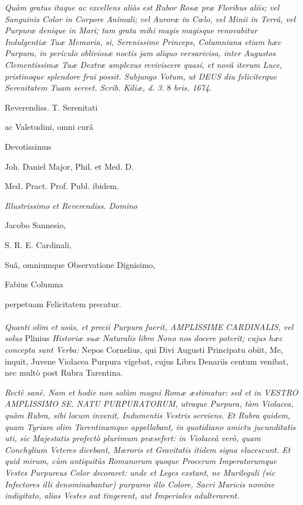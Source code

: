 \documentclass[a4paper, 11pt, oneside, polutonikogreek, german]{article}
\begin{document}
\emph{Quàm gratus itaque ac excellens aliàs est Rubor Rosæ præ Floribus aliis; vel Sanguinis Color in Corpore Animali; vel Auroræ in Cœlo, vel Minii in Terrâ, vel Purpuræ denique in Mari; tam grata mihi magis magisque renovabitur Indulgentiæ Tuæ Memoria, si, Serenissime Princeps, Columniana etiam hæc Purpura, in periculo obliviosæ noctis jam aliquo versarivisa, inter Augustos Clementissimæ Tuæ Dextræ amplexus reviviscere quasi, et novâ iterum Luce, pristinoque splendore frui possit. Subjungo Votum, ut DEUS diu feliciterque Serenitatem Tuam servet. Scrib. Kiliæ, d. 3.} 8 \emph{bris. 1674.}
\begin{center}

Reverendiss. T. Serenitati

{\footnotesize ac Valetudini, omni curâ}

{\footnotesize Devotissimus}

{\footnotesize Joh. Daniel Major, Phil. et Med. D.}

{\footnotesize Med. Pract. Prof. Publ. ibidem.}
\end{center}
\clearpage
\begin{center}
\emph{Illustrissimo et Reverendiss. Domino}

Jacobo Sannesio,

{\footnotesize S. R. E. Cardinali,}

{\footnotesize Suâ, omniumque Observatione Dignisimo,}

{\footnotesize Fabius Columna}

{\footnotesize perpetuam Felicitatem precatur.}
\end{center}
\paragraph{}
\emph{Quanti olim et usûs, et precii Purpura fuerit, AMPLISSIME CARDINALIS, vel solus} Plinius \emph{Historiæ suæ Naturalis libro Nono nos docere poterit; cujus hæc concepta sunt Verba:} Nepos Cornelius, qui Divi Augusti Principatu obiit, Me, inquit, Juvene Violacea Purpura vigebat, cujus Libra Denariis centum venibat, nec multò post Rubra Tarentina.

\emph{Rectè sanè. Nam et hodie non solùm magni Romæ æstimatur: sed et in VESTRO AMPLISSIMO SE. NATU PURPURATORUM, utraque Purpura, tàm Violacea, quàm Rubra, sibi locum invenit, Indumentis Vestris serviens. Et Rubra quidem, quam Tyriam olim Tarentinamque appellabant, in quotidiano amictu jucunditatis uti, sic Majestatis profectò plurimum præsefert: in Violaceà verò, quam Conchylium Veteres dicebant, Mœroris et Gravitatis itidem signa elucescunt. Et quid mirum, cùm antiquitùs Romanorum quoque Procerum Imperatorumque Vestes Purpureus Color decoraret: unde et Leges exstant, ne Murileguli (sic Infectores illi denominabantur) purpureo illo Colore, Sacri Muricis nomine indigitato, alias Vestes aut tingerent, aut Imperiales adulterarent.}
\end{document}
